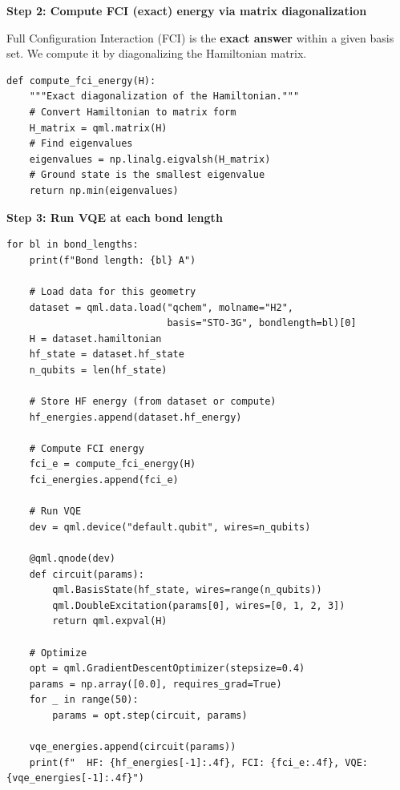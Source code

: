 \documentclass[11pt,a4paper]{article}
\begin{document}
\textbf{Step 2: Compute FCI (exact) energy via matrix diagonalization}

Full Configuration Interaction (FCI) is the \textbf{exact answer} within a given basis set. We compute it by diagonalizing the Hamiltonian matrix.
\begin{lstlisting}
def compute_fci_energy(H):
    """Exact diagonalization of the Hamiltonian."""
    # Convert Hamiltonian to matrix form
    H_matrix = qml.matrix(H)
    # Find eigenvalues
    eigenvalues = np.linalg.eigvalsh(H_matrix)
    # Ground state is the smallest eigenvalue
    return np.min(eigenvalues)
\end{lstlisting}

\textbf{Step 3: Run VQE at each bond length}
\begin{lstlisting}
for bl in bond_lengths:
    print(f"Bond length: {bl} A")
    
    # Load data for this geometry
    dataset = qml.data.load("qchem", molname="H2",
                            basis="STO-3G", bondlength=bl)[0]
    H = dataset.hamiltonian
    hf_state = dataset.hf_state
    n_qubits = len(hf_state)
    
    # Store HF energy (from dataset or compute)
    hf_energies.append(dataset.hf_energy)
    
    # Compute FCI energy
    fci_e = compute_fci_energy(H)
    fci_energies.append(fci_e)
    
    # Run VQE
    dev = qml.device("default.qubit", wires=n_qubits)
    
    @qml.qnode(dev)
    def circuit(params):
        qml.BasisState(hf_state, wires=range(n_qubits))
        qml.DoubleExcitation(params[0], wires=[0, 1, 2, 3])
        return qml.expval(H)
    
    # Optimize
    opt = qml.GradientDescentOptimizer(stepsize=0.4)
    params = np.array([0.0], requires_grad=True)
    for _ in range(50):
        params = opt.step(circuit, params)
    
    vqe_energies.append(circuit(params))
    print(f"  HF: {hf_energies[-1]:.4f}, FCI: {fci_e:.4f}, VQE: {vqe_energies[-1]:.4f}")
\end{lstlisting}
\end{document}
